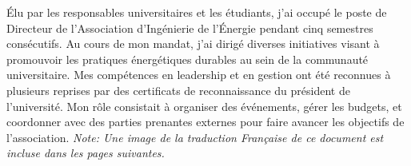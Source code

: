 \documentclass{article}
\begin{document}
    \par
    Élu par les responsables universitaires et les étudiants, j'ai occupé le poste de Directeur de l'Association d'Ingénierie de l'Énergie pendant cinq semestres consécutifs. Au cours de mon mandat, j'ai dirigé diverses initiatives visant à promouvoir les pratiques énergétiques durables au sein de la communauté universitaire. Mes compétences en leadership et en gestion ont été reconnues à plusieurs reprises par des certificats de reconnaissance du président de l'université. Mon rôle consistait à organiser des événements, gérer les budgets, et coordonner avec des parties prenantes externes pour faire avancer les objectifs de l'association.
    \newline
    \newline
    \textit {Note: Une image de la traduction Française de ce document est incluse dans les pages suivantes.}
    \newline
    \newline

    \newpage
\end{document}
